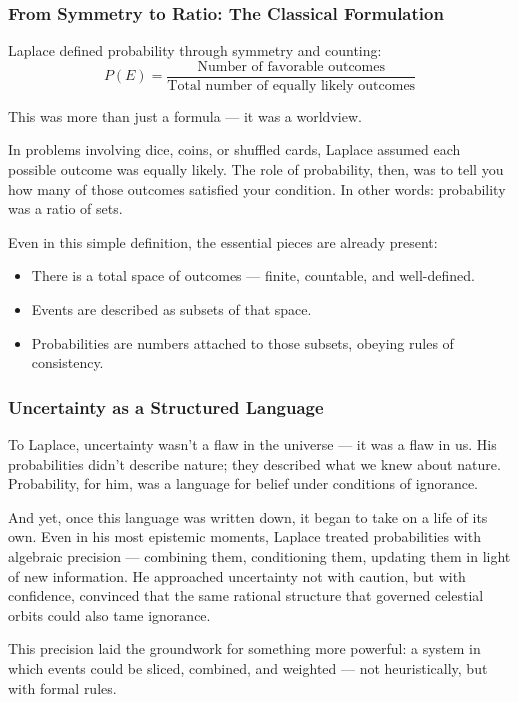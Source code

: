 \subsubsection*{From Symmetry to Ratio: The Classical Formulation}

Laplace defined probability through symmetry and counting:
\[
P(E) = \frac{\text{Number of favorable outcomes}}{\text{Total number of equally likely outcomes}}
\]

This was more than just a formula — it was a worldview.

In problems involving dice, coins, or shuffled cards, Laplace assumed each possible outcome was equally likely. The role of probability, then, was to tell you how many of those outcomes satisfied your condition. In other words: probability was a ratio of sets.

Even in this simple definition, the essential pieces are already present:
\begin{itemize}
    \item There is a total space of outcomes — finite, countable, and well-defined.
    \item Events are described as subsets of that space.
    \item Probabilities are numbers attached to those subsets, obeying rules of consistency.
\end{itemize}

\subsubsection*{Uncertainty as a Structured Language}

To Laplace, uncertainty wasn’t a flaw in the universe — it was a flaw in us. His probabilities didn’t describe nature; they described what we knew about nature. Probability, for him, was a language for belief under conditions of ignorance.

And yet, once this language was written down, it began to take on a life of its own. Even in his most epistemic moments, Laplace treated probabilities with algebraic precision — combining them, conditioning them, updating them in light of new information. He approached uncertainty not with caution, but with confidence, convinced that the same rational structure that governed celestial orbits could also tame ignorance.

This precision laid the groundwork for something more powerful: a system in which events could be sliced, combined, and weighted — not heuristically, but with formal rules.

